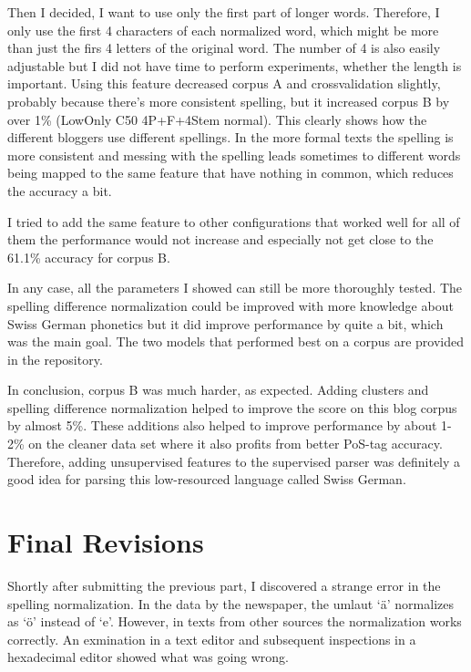 \documentclass[11pt,letterpaper, covington]{article}
\begin{document}
Then I decided, I want to use only the first part of longer words. Therefore, I only use the first 4 characters of each normalized word, which might be more than just the firs 4 letters of the original word. The number of 4 is also easily adjustable but I did not have time to perform experiments, whether the length is important. Using this feature decreased corpus A and crossvalidation slightly, probably because there's more consistent spelling, but it increased corpus B by over 1\% (LowOnly C50 4P+F+4Stem normal). This clearly shows how the different bloggers use different spellings. In the more formal texts the spelling is more consistent and messing with the spelling leads sometimes to different words being mapped to the same feature that have nothing in common, which reduces the accuracy a bit.

I tried to add the same feature to other configurations that worked well for all of them the performance would not increase and especially not get close to the 61.1\% accuracy for corpus B.

In any case, all the parameters I showed can still be more thoroughly tested. The spelling difference normalization could be improved with more knowledge about Swiss German phonetics but it did improve performance by quite a bit, which was the main goal. The two models that performed best on a corpus are provided in the repository.


In conclusion, corpus B was much harder, as expected. Adding clusters and spelling difference normalization helped to improve the score on this blog corpus by almost 5\%. These additions also helped to improve performance by about 1-2\% on the cleaner data set where it also profits from better PoS-tag accuracy. Therefore, adding unsupervised features to the supervised parser was definitely a good idea for parsing this low-resourced language called Swiss German.

\section{Final Revisions}

Shortly after submitting the previous part, I discovered a strange error in the spelling normalization. In the data by the newspaper, the umlaut `ä' normalizes as `ö' instead of `e'. However, in texts from other sources the normalization works correctly. An exmination in a text editor and subsequent inspections in a hexadecimal editor showed what was going wrong.
\end{document}
